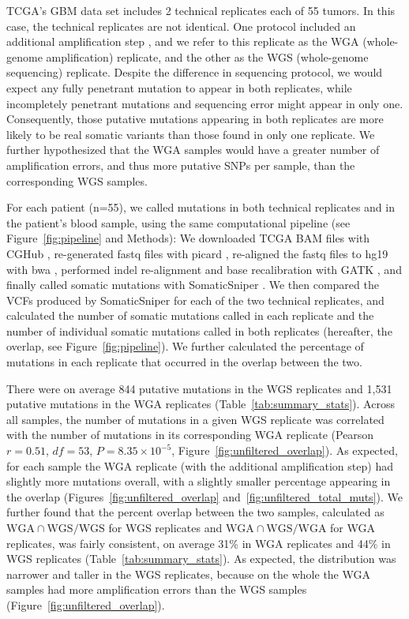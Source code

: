 \documentclass[11pt]{article} %
\begin{document}
TCGA's GBM data set includes 2 technical replicates each of 55 tumors. In this case, the technical replicates are not identical. One protocol included an additional amplification step \citep{TCGA-GBM}, and we refer to this replicate as the WGA (whole-genome amplification) replicate, and the other as the WGS (whole-genome sequencing) replicate. Despite the difference in sequencing protocol, we would expect any fully penetrant mutation to appear in both replicates, while incompletely penetrant mutations and sequencing error might appear in only one. Consequently, those putative mutations appearing in both replicates are more likely to be real somatic variants than those found in only one replicate. We further hypothesized that the WGA samples would have a greater number of amplification errors, and thus more putative SNPs per sample, than the corresponding WGS samples. 

For each patient (n=55), we called mutations in both technical replicates and in the patient's blood sample, using the same computational pipeline (see Figure~\ref{fig:pipeline} and Methods): We downloaded TCGA BAM files with CGHub \citep{CGHub}, re-generated fastq files with picard \citep{picard}, re-aligned the fastq files to hg19 with bwa \citep{bwa}, performed indel re-alignment and base recalibration with GATK \citep{GATK}, and finally called somatic mutations with SomaticSniper \citep{SomaticSniper}. We then compared the VCFs produced by SomaticSniper for each of the two technical replicates, and calculated the number of somatic mutations called in each replicate and the number of individual somatic mutations called in both replicates (hereafter, the overlap, see Figure~\ref{fig:pipeline}). We further calculated the percentage of mutations in each replicate that occurred in the overlap between the two. 


There were on average 844 putative mutations in the WGS replicates and 1,531 putative mutations in the WGA replicates (Table~\ref{tab:summary_stats}). Across all samples, the number of mutations in a given WGS replicate was correlated with the number of mutations in its corresponding WGA replicate (Pearson $r=0.51$, $df=53$, $P=8.35\times10^{-5}$, Figure~\ref{fig:unfiltered_overlap}). As expected, for each sample the WGA replicate (with the additional amplification step) had slightly more mutations overall, with a slightly smaller percentage appearing in the overlap (Figures~\ref{fig:unfiltered_overlap} and~\ref{fig:unfiltered_total_muts}). We further found that the percent overlap between the two samples, calculated as $\text{WGA} \cap \text{WGS}/\text{WGS}$ for WGS replicates and $\text{WGA} \cap \text{WGS}/\text{WGA}$ for WGA replicates, was fairly consistent, on average 31\% in WGA replicates and 44\% in WGS replicates (Table~\ref{tab:summary_stats}). As expected, the distribution was narrower and taller in the WGS replicates, because on the whole the WGA samples had more amplification errors than the WGS samples (Figure~\ref{fig:unfiltered_overlap}).
\end{document}
